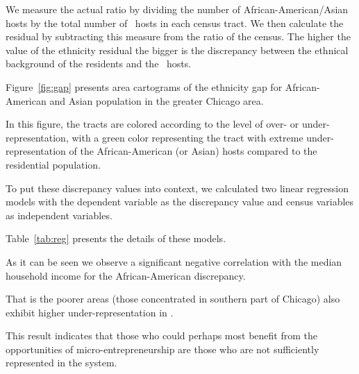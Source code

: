 We measure the actual ratio by dividing the number of African-American/Asian hosts by the total number of \ab \  hosts in each census tract.
We then calculate the residual by subtracting this measure from the ratio of  the census. The higher the value of the ethnicity residual the bigger is the discrepancy between the ethnical background of the residents and the \ab \  hosts.
 
Figure~\ref{fig:gap} presents area cartograms  of the ethnicity gap for African-American and Asian population in the greater Chicago area.

In this figure, the tracts are colored according to the level of over- or under-representation, with a green color representing the tract with extreme under-representation of the African-American (or Asian) hosts compared to the residential population.

To put these discrepancy values into context,  we calculated two linear regression models with the dependent variable as the discrepancy value and census variables as independent variables.

Table~\ref{tab:reg} presents the details of these models.

As it can be seen we observe a significant negative correlation with the median household income for the African-American discrepancy.

That is the poorer areas (those concentrated in southern part of Chicago) also exhibit higher under-representation in \ab.

This result indicates that those who could perhaps most benefit from the opportunities of micro-entrepreneurship are those who are not sufficiently represented in the system.  

